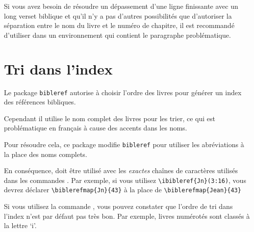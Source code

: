 \documentclass{ltxdoc}
\begin{document}
Si vous avez besoin de résoudre un dépassement d'une ligne finissante avec un long verset biblique et qu'il n'y a pas d'autres possibilités que d'autoriser la séparation entre le nom du livre et le numéro de chapitre, il est recommandé d'utiliser  dans un environnement qui contient le paragraphe problématique.

\section{Tri dans l'index}
Le package \verb|bibleref| autorise à choisir l'ordre des livres pour générer un index des références bibliques.

Cependant il utilise le nom complet des livres pour les trier, ce qui est problématique en français à cause des accents dans les noms.

Pour résoudre cela, ce package modifie \verb|bibleref| pour utiliser les abréviations à la place des noms complets.
 
En conséquence,  doit être utilisé avec les \emph{exactes} chaînes de caractères utilisés dans les commandes . Par exemple, si vous utilisez \verb|\ibibleref{Jn}(3:16)|, vous devrez déclarer \verb|\biblerefmap{Jn}{43}| à la place de \verb|\biblerefmap{Jean}{43}|


 Si vous utilisez la commande , vous pouvez constater que l'ordre de tri dans l'index n'est par défaut pas très bon. Par exemple, livres numérotés sont classés à la lettre `i'. 
\end{document}
